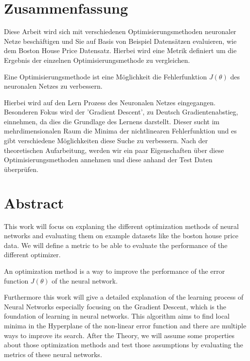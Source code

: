 \section*{Zusammenfassung}

Diese Arbeit wird sich mit verschiedenen 
Optimisierungsmethoden neuronaler Netze beschäftigen
und Sie auf Basis von Beispiel Datensätzen evaluieren,
wie dem Boston House Price Datensatz.
Hierbei wird eine Metrik definiert um die Ergebnis der einzelnen 
Optimisierungsmethode zu vergleichen. 

Eine Optimisierungsmethode ist eine Möglichkeit
die Fehlerfunktion $J(\theta)$ des neuronalen Netzes zu verbessern. 
 
Hierbei wird auf den Lern Prozess des Neuronalen
Netzes eingegangen. Besonderen Fokus wird der 'Gradient Descent',
zu Deutsch Gradientenabstieg, einnehmen, da dies die Grundlage
des Lernens darstellt. Dieser sucht im mehrdimensionalen Raum
die Minima der nichtlinearen Fehlerfunktion und
es gibt verschiedene Möglichkeiten diese Suche zu verbessern.   
Nach der theoretischen Aufarbeitung,
werden wir ein paar Eigenschaften über
diese Optimisierungsmethoden annehmen
und diese anhand der Test Daten überprüfen.


\section*{Abstract}

This work will focus on explaning the different optimization methods of neural networks and evaluating them
on example datasets like the boston house price data.
We will define a metric to be able to evaluate the performance 
of the different optimizer.

An optimization method is a way to improve the performance of the error 
function $J(\theta)$ of the neural network. 


Furthermore this work will give a detailed explanation of the learning process of Neural Networks
especially focusing on the Gradient Descent, which is the foundation of learning in neural networks. This algorithm aims to find local minima in the Hyperplane of the non-linear error function and there are multiple ways to improve its search. 
After the Theory, we will assume some properties about those optimization methods and test those assumptions
by evaluating the metrics of these neural networks.

